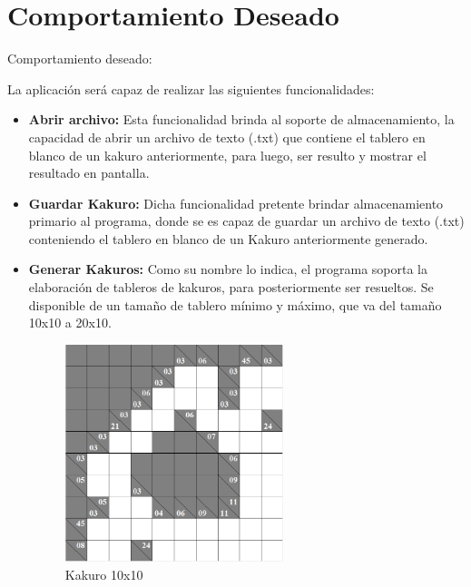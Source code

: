 \documentclass[journal]{IEEEtran}
\begin{document}
\section{Comportamiento Deseado}
Comportamiento deseado:

La aplicación será capaz de realizar las siguientes funcionalidades:

\begin{itemize}
	
	\item{\bf Abrir archivo:} Esta funcionalidad brinda al soporte de almacenamiento, la capacidad de abrir un archivo de texto (.txt) que contiene el tablero en blanco de un kakuro anteriormente, para luego, ser resulto y mostrar el resultado en pantalla.
	
\end{itemize}	
	
	\begin{itemize}
		\item{\bf Guardar Kakuro:}  Dicha funcionalidad pretente brindar almacenamiento primario al programa, donde se es capaz de guardar un archivo de texto (.txt) conteniendo el tablero en blanco de un Kakuro anteriormente generado.
	\end{itemize}

	\begin{itemize}
		
	\newpage	
	\item{\bf Generar Kakuros:}  Como su nombre lo indica, el programa soporta la elaboración de tableros de kakuros, para posteriormente ser resueltos. Se disponible de un tamaño de tablero mínimo y máximo, que va del tamaño 10x10 a 20x10.\\
	
		\begin{figure}[h]
			\centering
			\includegraphics[width = 180pt]{Kakuro_10x10_No.png}
			\caption{Kakuro 10x10}
		\end{figure}

	\end{itemize}
\end{document}
